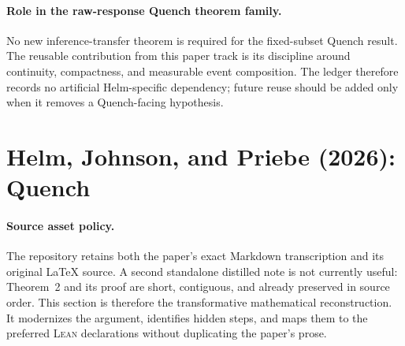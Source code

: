\documentclass[11pt]{article}
\newcommand{\Lean}{\textsc{Lean}}
\begin{document}
\paragraph{Role in the raw-response Quench theorem family.}
No new inference-transfer theorem is required for the fixed-subset Quench
result.  The reusable contribution from this paper track is its discipline
around continuity, compactness, and measurable event composition.  The ledger
therefore records no artificial Helm-specific dependency; future reuse should
be added only when it removes a Quench-facing hypothesis.

\section{Helm, Johnson, and Priebe (2026): Quench}

\paragraph{Source asset policy.}
The repository retains both the paper's exact Markdown transcription and its
original \LaTeX{} source.  A second standalone distilled note is not currently
useful: Theorem~2 and its proof are short, contiguous, and already preserved in
source order.  This section is therefore the transformative mathematical
reconstruction.  It modernizes the argument, identifies hidden steps, and maps
them to the preferred \Lean{} declarations without duplicating the paper's
prose.
\end{document}
